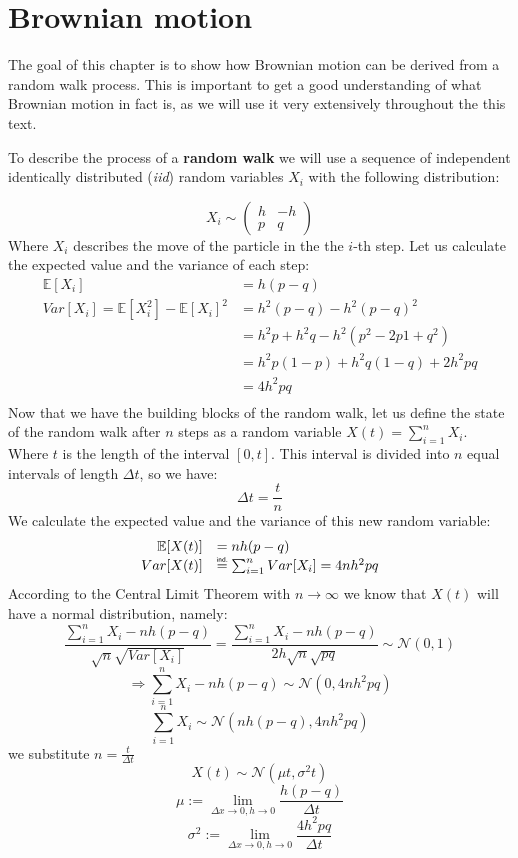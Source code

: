 \documentclass[times, utf8, diplomski]{fer}
\begin{document}


\section{Brownian motion}
The goal of this chapter is to show how Brownian motion can be derived from a random walk process. This is important to get a good understanding of what Brownian motion in fact is, as we will use it very extensively throughout the this text.

\noindent To describe the process of a \textbf{random walk} we will use a sequence of independent identically distributed (\textit{iid}) random variables $X_i$ with the following distribution:

$$ X_i \sim \left( \begin{array}{cc} h & -h \\
					p & q \end{array} \right)$$
Where $X_i$ describes the move of the particle in the the $i$-th step.
Let us calculate the expected value and the variance of each step:
$$
	\begin{array}{rl}
									\mathbb{E}[X_i] &= h(p-q) \\
		Var[X_i] = \mathbb{E}[X_i^2] - \mathbb{E}[X_i]^2 &= h^2(p-q) - h^2(p-q)^2 \\
										&= h^2p + h^2q - h^2(p^2 - 2p1 + q^2)\\
										&= h^2p(1-p) + h^2q(1-q) + 2h^2pq\\
										&= 4h^2pq \\
	\end{array}
$$
Now that we have the building blocks of the random walk, let us define the state of the random walk after $n$ steps as a random variable $X(t) = \sum_{i=1}^n X_i$. Where $t$ is the length of the interval $[0,t]$. This interval is divided into $n$ equal intervals of length $\Delta t$, so we have:
$$ \Delta t = \frac{t}{n}$$
We calculate the expected value and the variance of this new random variable:
$$
	\begin{array}{rl}
		\mathbb{E}[X(t)] &= nh(p-q) \\
		Var[X(t)] &\indeq \sum_{i=1}^n Var[X_i] = 4nh^2pq \\
	\end{array}
$$
According to the Central Limit Theorem with $n \rightarrow \infty$ we know that $X(t)$ will have a normal distribution, namely:
$$ \frac{\sum_{i=1}^n X_i - nh(p-q)}{\sqrt{n}\sqrt{Var[X_i]}} = \frac{\sum_{i=1}^n X_i - nh(p-q)}{2h\sqrt{n}\sqrt{pq}} \sim \mathcal{N}(0,1) $$
$$ \Rightarrow \sum_{i=1}^n X_i - nh(p-q) \sim \mathcal{N}(0,4nh^2pq)$$
$$ \sum_{i=1}^n X_i \sim \mathcal{N}(nh(p-q), 4nh^2pq)$$
we substitute $n=\frac{t}{\Delta t}$
$$ X(t) \sim \mathcal{N}(\mu t, \sigma^2t)$$
$$\mu := \lim_{\Delta x \to 0, h \to 0} \frac{h(p-q)}{\Delta t}$$
$$\sigma^2 := \lim_{\Delta x \to 0, h \to 0} \frac{4h^2pq}{\Delta t}$$
\end{document}
